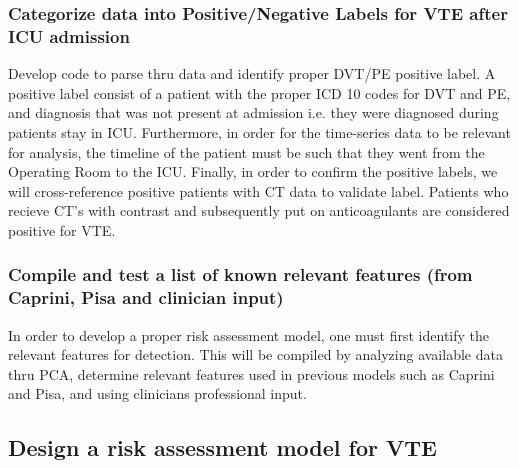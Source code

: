 \documentclass{article}
\begin{document}
\subsubsection{Categorize data into Positive/Negative Labels for VTE after ICU admission}
Develop code to parse thru data and identify proper DVT/PE positive label. A positive label consist of a patient with the proper ICD 10 codes for DVT and PE, and diagnosis that was not present at admission i.e. they were diagnosed during patients stay in ICU. Furthermore, in order for the time-series data to be relevant for analysis, the timeline of the patient must be such that they went from the Operating Room to the ICU. Finally, in order to confirm the positive labels, we will cross-reference positive patients with CT data to validate label. Patients who recieve CT's with contrast and subsequently put on anticoagulants are considered positive for VTE. 

\subsubsection{Compile and test a list of known relevant features (from Caprini, Pisa and clinician input)}

In order to develop a proper risk assessment model, one must first identify the relevant features for detection. This will be compiled by analyzing available data thru PCA, determine relevant features used in previous models such as Caprini and Pisa, and using clinicians professional input.  


\subsection{ Design a risk assessment model for VTE}

\end{document}
